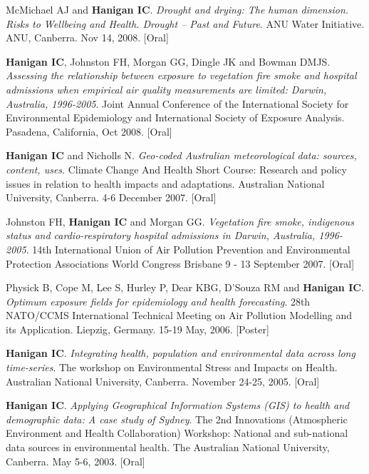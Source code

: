 \documentclass[a4paper,11pt]{article}
\begin{document}
\begin{revnumerate}
\item McMichael AJ and \textbf{Hanigan IC}. \emph{Drought and drying: The human dimension. Risks to Wellbeing and Health. Drought – Past and Future}. ANU Water Initiative. ANU, Canberra. Nov 14, 2008. [Oral]

\item \textbf{Hanigan IC}, Johnston FH, Morgan GG, Dingle JK and Bowman DMJS. \emph{Assessing the relationship between exposure to vegetation fire smoke and hospital admissions when empirical air quality measurements are limited: Darwin, Australia, 1996-2005}. Joint Annual Conference of the International Society for Environmental Epidemiology and International Society of Exposure Analysis. Pasadena, California, Oct 2008. [Oral]

\item \textbf{Hanigan IC} and Nicholls N. \emph{Geo-coded Australian meteorological data: sources, content, uses}. Climate Change And Health Short Course: Research and policy issues in relation to health impacts and adaptations.  Australian National University, Canberra. 4-6 December 2007. [Oral]

\item Johnston FH, \textbf{Hanigan IC} and Morgan GG. \emph{Vegetation fire smoke, indigenous status and cardio-respiratory hospital admissions in Darwin, Australia, 1996-2005}. 14th International Union of Air Pollution Prevention and Environmental Protection Associations World Congress Brisbane 9 - 13 September 2007. [Oral]

\item Physick B, Cope M, Lee S, Hurley P, Dear KBG, D’Souza RM and \textbf{Hanigan IC}. \emph{Optimum exposure fields for epidemiology and health forecasting}. 28th NATO/CCMS International Technical Meeting on Air Pollution Modelling and its Application. Liepzig, Germany. 15-19 May, 2006. [Poster]

\item \textbf{Hanigan IC}. \emph{Integrating health, population and environmental data across long time-series}. The workshop on Environmental Stress and Impacts on Health. Australian National University, Canberra. November 24-25, 2005. [Oral]

\item \textbf{Hanigan IC}. \emph{Applying Geographical Information Systems (GIS) to health and demographic data: A case study of Sydney}. The 2nd Innovations (Atmospheric Environment and Health Collaboration) Workshop: National and sub-national data sources in environmental health. The Australian National University, Canberra. May 5-6, 2003. [Oral]


\end{revnumerate}
\end{document}
